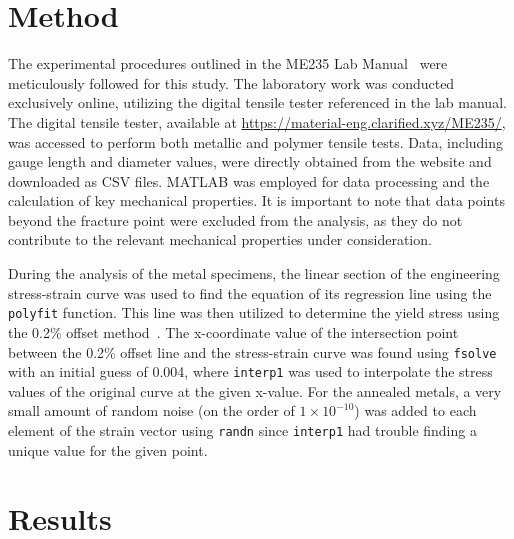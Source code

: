 \documentclass[11pt]{article}
\begin{document}
    \section{Method}
        The experimental procedures outlined in the ME235 Lab Manual~\cite{LM2023} were meticulously followed for this study. 
        The laboratory work was conducted exclusively online, utilizing the digital tensile tester referenced in the lab manual. 
        The digital tensile tester, available at \url{https://material-eng.clarified.xyz/ME235/}, was accessed to perform both metallic and polymer tensile tests. 
        Data, including gauge length and diameter values, were directly obtained from the website and downloaded as CSV files. 
        MATLAB was employed for data processing and the calculation of key mechanical properties. 
        It is important to note that data points beyond the fracture point were excluded from the analysis, as they do not contribute to the relevant mechanical properties under consideration.

        During the analysis of the metal specimens, the linear section of the engineering stress-strain curve was used to find the equation of its regression line using the \texttt{polyfit} function. 
        This line was then utilized to determine the yield stress using the 0.2\% offset method~\cite{Hibbeler2022}. 
        The x-coordinate value of the intersection point between the 0.2\% offset line and the stress-strain curve was found using \texttt{fsolve} with an initial guess of 0.004, where \texttt{interp1} was used to interpolate the stress values of the original curve at the given x-value. 
        For the annealed metals, a very small amount of random noise (on the order of \(1\times10^{-10}\)) was added to each element of the strain vector using \texttt{randn} since \texttt{interp1} had trouble finding a unique value for the given point.

    \section{Results}
\end{document}
